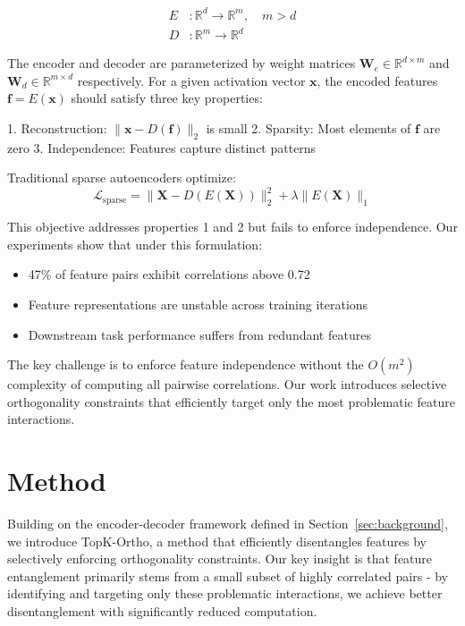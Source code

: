 \documentclass{article} %
\begin{document}
\begin{align*}
E &: \mathbb{R}^d \rightarrow \mathbb{R}^m, \quad m > d \\
D &: \mathbb{R}^m \rightarrow \mathbb{R}^d
\end{align*}

The encoder and decoder are parameterized by weight matrices $\mathbf{W}_e \in \mathbb{R}^{d \times m}$ and $\mathbf{W}_d \in \mathbb{R}^{m \times d}$ respectively. For a given activation vector $\mathbf{x}$, the encoded features $\mathbf{f} = E(\mathbf{x})$ should satisfy three key properties:

1. Reconstruction: $\|\mathbf{x} - D(\mathbf{f})\|_2$ is small
2. Sparsity: Most elements of $\mathbf{f}$ are zero
3. Independence: Features capture distinct patterns

Traditional sparse autoencoders optimize:
\begin{equation}
    \mathcal{L}_{\text{sparse}} = \|\mathbf{X} - D(E(\mathbf{X}))\|_2^2 + \lambda\|E(\mathbf{X})\|_1
\end{equation}

This objective addresses properties 1 and 2 but fails to enforce independence. Our experiments show that under this formulation:
\begin{itemize}
    \item 47\% of feature pairs exhibit correlations above 0.72
    \item Feature representations are unstable across training iterations
    \item Downstream task performance suffers from redundant features
\end{itemize}

The key challenge is to enforce feature independence without the $O(m^2)$ complexity of computing all pairwise correlations. Our work introduces selective orthogonality constraints that efficiently target only the most problematic feature interactions.

\section{Method}
\label{sec:method}

Building on the encoder-decoder framework defined in Section~\ref{sec:background}, we introduce TopK-Ortho, a method that efficiently disentangles features by selectively enforcing orthogonality constraints. Our key insight is that feature entanglement primarily stems from a small subset of highly correlated pairs - by identifying and targeting only these problematic interactions, we achieve better disentanglement with significantly reduced computation.
\end{document}
